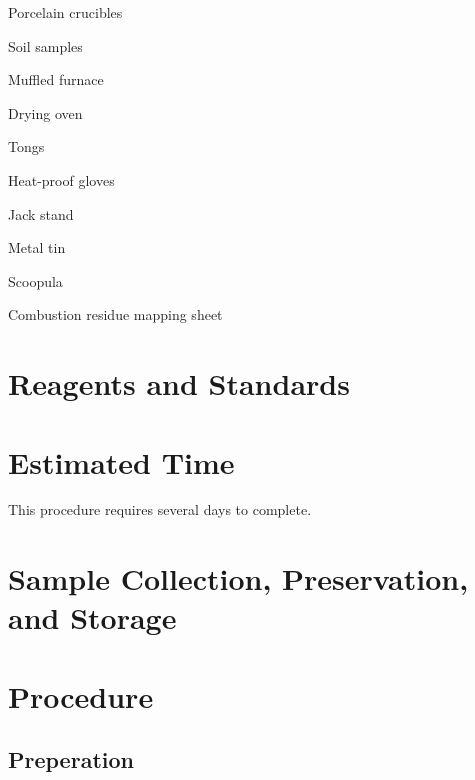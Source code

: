 \documentclass[12pt]{../SOP4_alpha}\usepackage[]{graphicx}\usepackage[]{xcolor}
\begin{document}
\begin{enumerate*}
	\item Porcelain crucibles
	\item Soil samples
	\item Muffled furnace
	\item Drying oven
	\item Tongs
	\item Heat-proof gloves
	\item Jack stand
	\item Metal tin
	\item Scoopula
	\item Combustion residue mapping sheet
\end{enumerate*}

\section{Reagents and Standards}


\section{Estimated Time}

\NP This procedure requires several days to complete.


\section{Sample Collection, Preservation, and Storage}



\section{Procedure}

\subsection{Preperation}
\end{document}
